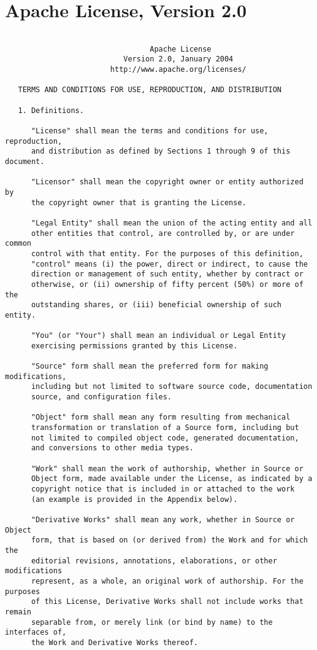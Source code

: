 \documentclass{InsightBook}
\begin{document}
\section{Apache License, Version 2.0}
\begin{verbatim}

                                 Apache License
                           Version 2.0, January 2004
                        http://www.apache.org/licenses/

   TERMS AND CONDITIONS FOR USE, REPRODUCTION, AND DISTRIBUTION

   1. Definitions.

      "License" shall mean the terms and conditions for use, reproduction,
      and distribution as defined by Sections 1 through 9 of this document.

      "Licensor" shall mean the copyright owner or entity authorized by
      the copyright owner that is granting the License.

      "Legal Entity" shall mean the union of the acting entity and all
      other entities that control, are controlled by, or are under common
      control with that entity. For the purposes of this definition,
      "control" means (i) the power, direct or indirect, to cause the
      direction or management of such entity, whether by contract or
      otherwise, or (ii) ownership of fifty percent (50%) or more of the
      outstanding shares, or (iii) beneficial ownership of such entity.

      "You" (or "Your") shall mean an individual or Legal Entity
      exercising permissions granted by this License.

      "Source" form shall mean the preferred form for making modifications,
      including but not limited to software source code, documentation
      source, and configuration files.

      "Object" form shall mean any form resulting from mechanical
      transformation or translation of a Source form, including but
      not limited to compiled object code, generated documentation,
      and conversions to other media types.

      "Work" shall mean the work of authorship, whether in Source or
      Object form, made available under the License, as indicated by a
      copyright notice that is included in or attached to the work
      (an example is provided in the Appendix below).

      "Derivative Works" shall mean any work, whether in Source or Object
      form, that is based on (or derived from) the Work and for which the
      editorial revisions, annotations, elaborations, or other modifications
      represent, as a whole, an original work of authorship. For the purposes
      of this License, Derivative Works shall not include works that remain
      separable from, or merely link (or bind by name) to the interfaces of,
      the Work and Derivative Works thereof.


\end{verbatim}
\end{document}
